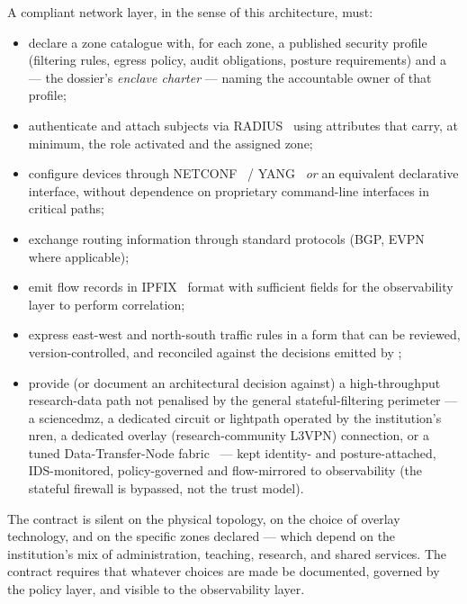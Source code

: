 \begin{contractbox}
\noindent A compliant network layer, in the sense of this
architecture, must:

\begin{itemize}[leftmargin=1.5em,nosep]
  \item declare a zone catalogue with, for each zone, a published
    security profile (filtering rules, egress policy, audit
    obligations, posture requirements) and a  --- the dossier's \emph{enclave
    charter} --- naming the accountable owner of that profile;
  \item authenticate and attach subjects via
    RADIUS~\cite{rfc-2865-radius} using attributes that carry, at
    minimum, the role activated and the assigned zone;
  \item configure devices through NETCONF~\cite{rfc-6241-netconf} /
    YANG~\cite{rfc-7950-yang} \emph{or} an equivalent declarative
    interface, without dependence on proprietary command-line
    interfaces in critical paths;
  \item exchange routing information through standard protocols
    (BGP, EVPN where applicable);
  \item emit flow records in IPFIX~\cite{rfc-7011-ipfix} format with
    sufficient fields for the observability layer to perform
    correlation;
  \item express east-west and north-south traffic rules in a form
    that can be reviewed, version-controlled, and reconciled against
    the decisions emitted by ;
  \item provide (or document an architectural decision against) a
    high-throughput research-data path not penalised by the general
    stateful-filtering perimeter --- a \gls{sciencedmz}, a dedicated
    circuit or lightpath operated by the institution's \gls{nren},
    a dedicated overlay
    (research-community L3VPN) connection, or a tuned Data-Transfer-Node
    fabric~\cite{geant-dtn} --- kept identity- and posture-attached,
    IDS-monitored, policy-governed and flow-mirrored to observability
    (the stateful firewall is bypassed, not the trust model).
\end{itemize}
\end{contractbox}

The contract is silent on the physical topology, on the choice of
overlay technology, and on the specific zones declared --- which
depend on the institution's mix of administration, teaching,
research, and shared services. The contract requires that whatever
choices are made be documented, governed by the policy layer, and
visible to the observability layer.

